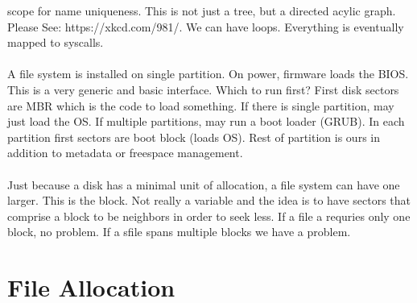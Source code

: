 \documentclass[../base_file/cs1550_notes.tex]{subfiles}
\begin{document}
scope for name uniqueness.  This is not just a tree, but a directed
acylic graph. Please See: https://xkcd.com/981/.  We can have loops.
Everything is eventually mapped to syscalls.\\\\
A file system is installed on  single partition.  On power, firmware
loads the BIOS.  This is a very generic and basic interface.  Which
to run first?  First disk sectors are MBR which is the code to load
something.  If there is single partition, may just load the OS.  If
multiple partitions, may run a boot loader (GRUB).  In each partition
first sectors are boot block (loads OS).  Rest of partition is ours
in addition to metadata or freespace management.\\\\
Just because a disk has a minimal unit of allocation, a file system
can have one larger.  This is the block.  Not really a variable and
the idea is to have sectors that comprise a block to be neighbors
in order to seek less.  If a file a requries only one block, no 
problem.  If a sfile spans multiple blocks we have a problem.
\section{File Allocation}
\end{document}
